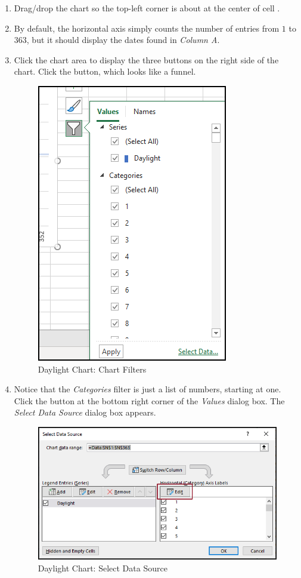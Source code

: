 \begin{enumerate}
	\item Drag/drop the chart so the top-left corner is about at the center of cell .
	\item By default, the horizontal axis simply counts the number of entries from $ 1 $ to $ 363 $, but it should display the dates found in \textit{Column A}.
	\item Click the chart area to display the three buttons on the right side of the chart. Click the  button, which looks like a funnel.
	
	\begin{figure}[H]
		\centering
		\includegraphics[width=\maxwidth{.50\linewidth}]{gfx/ch09_fig90}
		\caption{Daylight Chart: Chart Filters}
		\label{09:fig90}
	\end{figure}

	\item Notice that the \textit{Categories} filter is just a list of numbers, starting at one. Click the  button at the bottom right corner of the \textit{Values} dialog box. The \textit{Select Data Source} dialog box appears.

	\begin{figure}[H]
		\centering
		\includegraphics[width=\maxwidth{.75\linewidth}]{gfx/ch09_fig91}
		\caption{Daylight Chart: Select Data Source}
		\label{09:fig91}
	\end{figure}
	

\end{enumerate}
